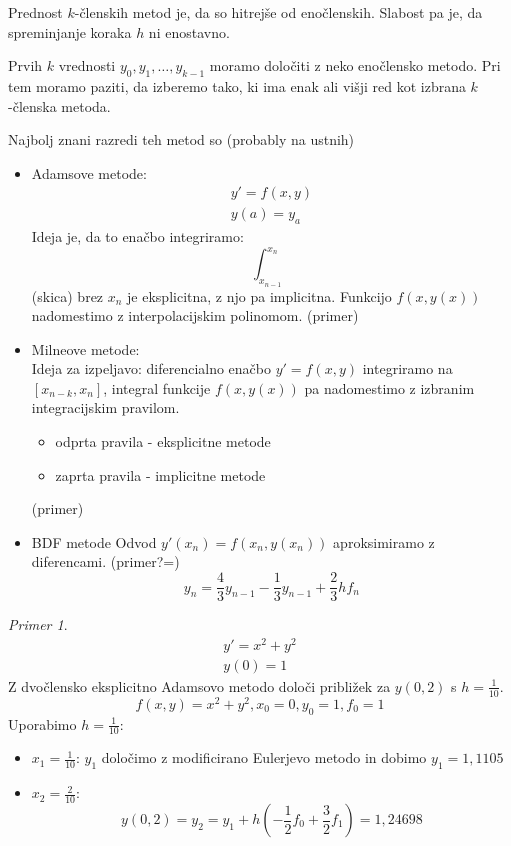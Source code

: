 \documentclass[a4paper,12pt]{article}
\theoremstyle{definition}
\theoremstyle{remark}
\newtheorem*{ex}{Primer}
\begin{document}
Prednost $k$-členskih metod je, da so hitrejše od enočlenskih. Slabost pa je, da spreminjanje koraka $h$ ni enostavno.

Prvih $k$ vrednosti $y_0, y_1, \dots, y_{k-1}$ moramo določiti z neko enočlensko metodo. Pri tem moramo paziti, da izberemo tako, ki ima enak ali višji red kot izbrana $k$-členska metoda.

Najbolj znani razredi teh metod so (probably na ustnih)
\begin{itemize}
    \item Adamsove metode:
    \begin{gather*}
        y' = f(x, y) \\
        y(a) = y_a
    \end{gather*}
    Ideja je, da to enačbo integriramo:
    \begin{equation*}
        \int_{x_{n-1}}^{x_n} 
    \end{equation*}
    (skica)
    brez $x_n$ je eksplicitna, z njo pa implicitna. Funkcijo $f(x, y(x))$ nadomestimo z interpolacijskim polinomom.
    (primer)
    \item Milneove metode: \\
    Ideja za izpeljavo: diferencialno enačbo $y' = f(x, y)$ integriramo na $[x_{n-k}, x_n]$, integral funkcije $f(x, y(x))$ pa nadomestimo
    z izbranim integracijskim pravilom.
    \begin{itemize}
        \item odprta pravila - eksplicitne metode
        \item zaprta pravila - implicitne metode
    \end{itemize}
    (primer)
    \item BDF metode
    Odvod $y'(x_n) = f(x_n, y(x_n))$ aproksimiramo z diferencami.
    (primer?=)
    \begin{equation*}
        y_n = \frac{4}{3} y_{n-1} - \frac{1}{3} y_{n-1} + \frac{2}{3} h f_n
    \end{equation*}
\end{itemize}

\begin{ex}
    \begin{gather*}
        y' = x^2 + y^2 \\
        y(0) = 1
    \end{gather*}
    Z dvočlensko eksplicitno Adamsovo metodo določi približek za $y(0, 2)$ s $h = \frac{1}{10}$.
    \begin{equation*}
        f(x, y) = x^2 + y^2, x_0 = 0, y_0 = 1, f_0 = 1
    \end{equation*}
    Uporabimo $h = \frac{1}{10}$:
    \begin{itemize}
        \item[] $x_1 = \frac{1}{10}$: $y_1$ določimo z modificirano Eulerjevo metodo in dobimo $y_1 = 1,1105$
        \item[] $x_2 = \frac{2}{10}$: 
        \begin{equation*}
            y(0, 2) = y_2 = y_1 + h(-\frac{1}{2} f_0 + \frac{3}{2} f_1) = 1,24698
        \end{equation*}
    \end{itemize}
\end{ex}
\end{document}
